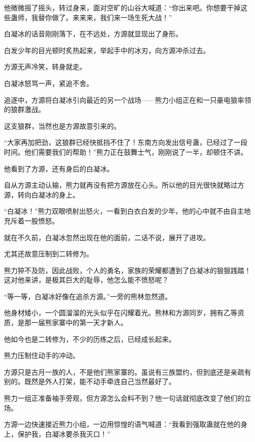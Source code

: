 \begin{this_body}
他微微摇了摇头，转过身来，面对空旷的山谷大喊道：“你出来吧。你想要干掉这些蛊师，我替你做了。来来来，我们来一场生死大战！”

白凝冰的话音刚刚落下，在不远处，方源就显现出了身形。

白发少年的目光顿时炙热起来，举起手中的冰刃，向方源冲杀过去。

方源无声冷笑，转身就走。

白凝冰怒骂一声，紧追不舍。

追逐中，方源将白凝冰引向最近的另一个战场——熊力小组正在和一只豪电狼率领的狼群激战。

这支狼群，当然也是方源故意引来的。

“大家再加把劲，这狼群已经快抵挡不住了！东南方向发出信号蛊，已经过了一段时间。他们需要我们的帮助！”熊力正在鼓舞士气，刚刚说了一半，却顿住不讲。

他看到了方源，还有身后的白凝冰。

自从方源主动认输，熊力就再没有把方源放在心头。所以他的目光很快就略过方源，转向白凝冰的身上。

“白凝冰！”熊力双眼喷射出怒火，一看到白衣白发的少年，他的心中就不由自主地充斥着一股愤怒。

就在不久前，白凝冰忽然出现在他的面前，二话不说，展开了进攻。

尤其还故意压制到二转修为。

熊力猝不及防，因此战败，个人的勇名，家族的荣耀都遭到了白凝冰的狠狠践踏！这对他来讲，是极其巨大的耻辱，他怎么能不愤怒呢？

“等一等，白凝冰好像在追杀方源。”一旁的熊林忽然道。

他身材矮小，一个圆溜溜的光头似乎在闪耀着光。熊林和方源同岁，拥有乙等资质，是那一届熊家寨中的第一天才新人。

他如今也是二转修为，不少的历练之后，已经成长起来。

熊力压制住动手的冲动。

方源只是古月一族的人，不是他们熊家寨的。虽说有三族盟约，但到底还是亲疏有别的。既然是外人打架，能不动手牵连自己当然最好了。

熊力一组正准备袖手旁观，但方源怎么会料不到？他一句话就彻底改变了他们的立场。

方源一边快速接近熊力小组，一边用惊惶的语气喊道：“我看到强取蛊就在他的身上，保护我，白凝冰要杀我灭口！”

\end{this_body}

